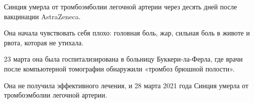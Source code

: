 Синция умерла от тромбоэмболии легочной артерии через десять дней после
вакцинации AstraZeneca.

Она начала чувствовать себя плохо: головная боль, жар, сильная боль в животе и
рвота, которая не утихала.

23 марта она была госпитализирована в больницу Буккери-ла-Ферла, где врачи после
компьютерной томографии обнаружили «тромбоз брюшной полости».

Она не получила эффективного лечения, и 28 марта 2021 года Синция умерла от
тромбоэмболии легочной артерии.

